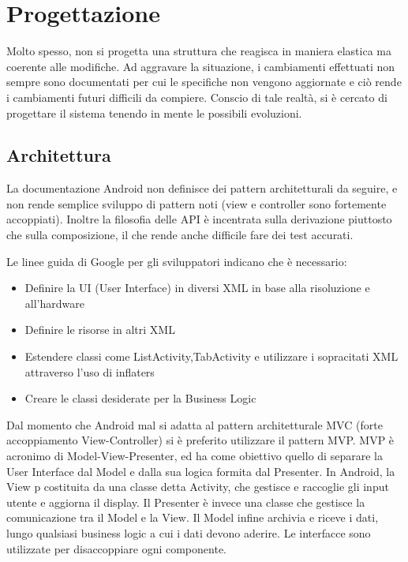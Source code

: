 \chapter{Progettazione} %

\label{Capitolo4} %


Molto spesso, non si progetta una struttura che reagisca in maniera elastica ma coerente alle modifiche.
Ad aggravare la situazione, i cambiamenti effettuati non sempre sono documentati per cui le specifiche non vengono aggiornate e ciò rende i cambiamenti futuri difficili da compiere. Conscio di tale realtà, si è cercato di progettare il sistema tenendo in mente le possibili evoluzioni.

\section{Architettura}

La documentazione Android non definisce dei pattern architetturali da seguire, e non rende semplice sviluppo di pattern noti (view e controller sono fortemente accoppiati). Inoltre la filosofia delle API è incentrata sulla derivazione piuttosto che sulla composizione, il che rende anche difficile fare dei test accurati.

Le linee guida di Google per gli sviluppatori indicano che è necessario:

\begin{itemize}
\item Definire la UI (User Interface) in diversi XML in base alla risoluzione e all'hardware
\item Definire le risorse in altri XML
\item Estendere classi come ListActivity,TabActivity e utilizzare i sopracitati XML attraverso l'uso di inflaters
\item Creare le classi desiderate per la Business Logic
\end{itemize}

Dal momento che Android mal si adatta al pattern architetturale MVC (forte accoppiamento View-Controller) si è preferito utilizzare il pattern MVP.
MVP è acronimo di Model-View-Presenter, ed ha come obiettivo quello di separare la User Interface dal Model e dalla sua logica formita dal Presenter.
In Android, la View p costituita da una classe detta Activity, che gestisce e raccoglie gli input utente e aggiorna il display. Il Presenter è invece una classe che gestisce la comunicazione tra il Model e la View. Il Model infine archivia e riceve i dati, lungo qualsiasi business logic a cui i dati devono aderire.
Le interfacce sono utilizzate per disaccoppiare ogni componente.


